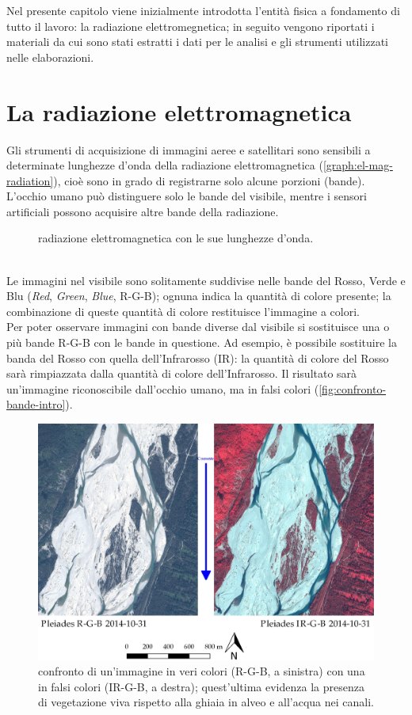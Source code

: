Nel presente capitolo viene inizialmente introdotta l'entità fisica a fondamento di tutto il lavoro: la radiazione elettromegnetica;
in seguito vengono riportati i materiali da cui sono stati estratti i dati per le analisi e gli strumenti utilizzati nelle elaborazioni.


\section{La radiazione elettromagnetica}
Gli strumenti di acquisizione di immagini aeree e satellitari sono sensibili a determinate lunghezze d'onda della radiazione elettromagnetica (\vref{graph:el-mag-radiation}), cioè sono in grado di registrarne solo alcune porzioni (bande).
L'occhio umano può distinguere solo le bande del visibile, mentre i sensori artificiali possono acquisire altre bande della radiazione.
%
\begin{figure}
	\centering
	
	\caption{radiazione elettromagnetica con le sue lunghezze d'onda.}
	\label{graph:el-mag-radiation}
\end{figure}
%
\\
Le immagini nel visibile sono solitamente suddivise nelle bande del Rosso, Verde e Blu (\emph{Red}, \emph{Green}, \emph{Blue}, R-G-B); ognuna indica la quantità di colore presente; la combinazione di queste quantità di colore restituisce l'immagine a colori.
\\
Per poter osservare immagini con bande diverse dal visibile si sostituisce una o più bande R-G-B con le bande in questione.
Ad esempio, è possibile sostituire la banda del Rosso con quella dell'Infrarosso (IR): la quantità di colore del Rosso sarà rimpiazzata dalla quantità di colore dell'Infrarosso.
Il risultato sarà un'immagine riconoscibile dall'occhio umano, ma in falsi colori (\vref{fig:confronto-bande-intro}).
%
\begin{figure}
	\centering
	\includegraphics[width=\textwidth]{files/confronto_bande_intro.jpeg}
	\caption[confronto immagini R-G-B e IR-R-G]{confronto di un'immagine in veri colori (R-G-B, a sinistra) con una in falsi colori (IR-G-B, a destra); quest'ultima evidenza la presenza di vegetazione viva rispetto alla ghiaia in alveo e all'acqua nei canali.}
	\label{fig:confronto-bande-intro}
\end{figure}
